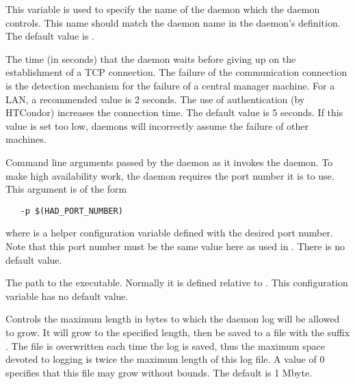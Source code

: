 \begin{description}
\label{param:HADControllee}
\item[\Macro{HAD\_CONTROLLEE}]
  This variable is used to specify the name of the daemon which the
   daemon controls.   This name should match the daemon
  name in the  daemon's  definition.  
  The default value is .

\label{param:HADConnectionTimeout}
\item[\Macro{HAD\_CONNECTION\_TIMEOUT}]
  The time (in seconds) that the  daemon waits before giving
  up on the establishment of a TCP connection.
  The failure of the communication connection
  is the detection mechanism for the failure of a central
  manager machine.
  For a LAN, a recommended value is 2 seconds.
  The use of authentication (by HTCondor) increases the connection
  time.
  The default value is 5 seconds.
  If this value is set too low,
   daemons will incorrectly assume
  the failure of other machines.

\label{param:HADArgs}
\item[\Macro{HAD\_ARGS}]
  Command line arguments passed by the  daemon
  as it invokes the  daemon.
  To make high availability work, the  daemon
  requires the port number it is to use.
  This argument is of the form
  \begin{verbatim}
   -p $(HAD_PORT_NUMBER)
  \end{verbatim}
  where  is a helper configuration variable
  defined with the desired port number.
  Note that this port number must be the same value here as
  used in .
  There is no default value.


\label{param:HAD}
\item[\Macro{HAD}]
  The path to the  executable. Normally it is defined
  relative to .
  This configuration variable has no default value.

\label{param:MaxHADLog}
\item[\Macro{MAX\_HAD\_LOG}]
  Controls the maximum length in bytes to which the 
  daemon log will be allowed to grow. It will grow to the specified length,
  then be saved to a file with the suffix . 
  The   file is overwritten each time the log is saved,
  thus the maximum space devoted to logging is twice the maximum length
  of this log file.
  A value of 0 specifies that this file may grow without bounds.
  The default is 1 Mbyte.


\end{description}

